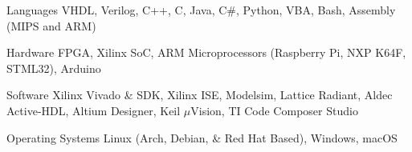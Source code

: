 
\begin{cvskills}
	\cvskill
	{Languages}
	{VHDL, Verilog, C++, C, Java, C\#, Python, VBA, Bash, Assembly (MIPS and ARM)}

	\cvskill
	{Hardware}
	{FPGA, Xilinx SoC, ARM Microprocessors (Raspberry Pi, NXP K64F, STML32), Arduino}

	\cvskill
	{Software}
	{Xilinx Vivado \& SDK, Xilinx ISE, Modelsim, Lattice Radiant, Aldec Active-HDL, Altium Designer, Keil $\mu$Vision, TI Code Composer Studio}

	\cvskill
	{Operating Systems}
	{Linux (Arch, Debian, \& Red Hat Based), Windows, macOS}

\end{cvskills}
